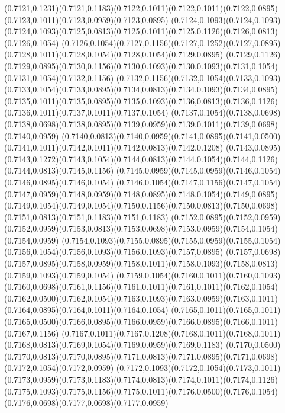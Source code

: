 (0.7121,0.1231)(0.7121,0.1183)(0.7122,0.1011)(0.7122,0.1011)(0.7122,0.0895)(0.7123,0.1011)(0.7123,0.0959)(0.7123,0.0895)
(0.7124,0.1093)(0.7124,0.1093)(0.7124,0.1093)(0.7125,0.0813)(0.7125,0.1011)(0.7125,0.1126)(0.7126,0.0813)(0.7126,0.1054)
(0.7126,0.1054)(0.7127,0.1156)(0.7127,0.1252)(0.7127,0.0895)(0.7128,0.1011)(0.7128,0.1054)(0.7128,0.1054)(0.7129,0.0895)
(0.7129,0.1126)(0.7129,0.0895)(0.7130,0.1156)(0.7130,0.1093)(0.7130,0.1093)(0.7131,0.1054)(0.7131,0.1054)(0.7132,0.1156)
(0.7132,0.1156)(0.7132,0.1054)(0.7133,0.1093)(0.7133,0.1054)(0.7133,0.0895)(0.7134,0.0813)(0.7134,0.1093)(0.7134,0.0895)
(0.7135,0.1011)(0.7135,0.0895)(0.7135,0.1093)(0.7136,0.0813)(0.7136,0.1126)(0.7136,0.1011)(0.7137,0.1011)(0.7137,0.1054)
(0.7137,0.1054)(0.7138,0.0698)(0.7138,0.0698)(0.7138,0.0895)(0.7139,0.0959)(0.7139,0.1011)(0.7139,0.0698)(0.7140,0.0959)
(0.7140,0.0813)(0.7140,0.0959)(0.7141,0.0895)(0.7141,0.0500)(0.7141,0.1011)(0.7142,0.1011)(0.7142,0.0813)(0.7142,0.1208)
(0.7143,0.0895)(0.7143,0.1272)(0.7143,0.1054)(0.7144,0.0813)(0.7144,0.1054)(0.7144,0.1126)(0.7144,0.0813)(0.7145,0.1156)
(0.7145,0.0959)(0.7145,0.0959)(0.7146,0.1054)(0.7146,0.0895)(0.7146,0.1054)
\PST@Solid(0.7146,0.1054)(0.7147,0.1156)(0.7147,0.1054)(0.7147,0.0959)(0.7148,0.0959)(0.7148,0.0895)(0.7148,0.1054)(0.7149,0.0895)
(0.7149,0.1054)(0.7149,0.1054)(0.7150,0.1156)(0.7150,0.0813)(0.7150,0.0698)(0.7151,0.0813)(0.7151,0.1183)(0.7151,0.1183)
(0.7152,0.0895)(0.7152,0.0959)(0.7152,0.0959)(0.7153,0.0813)(0.7153,0.0698)(0.7153,0.0959)(0.7154,0.1054)(0.7154,0.0959)
(0.7154,0.1093)(0.7155,0.0895)(0.7155,0.0959)(0.7155,0.1054)(0.7156,0.1054)(0.7156,0.1093)(0.7156,0.1093)(0.7157,0.0895)
(0.7157,0.0698)(0.7157,0.0895)(0.7158,0.0959)(0.7158,0.1011)(0.7158,0.1093)(0.7158,0.0813)(0.7159,0.1093)(0.7159,0.1054)
(0.7159,0.1054)(0.7160,0.1011)(0.7160,0.1093)(0.7160,0.0698)(0.7161,0.1156)(0.7161,0.1011)(0.7161,0.1011)(0.7162,0.1054)
(0.7162,0.0500)(0.7162,0.1054)(0.7163,0.1093)(0.7163,0.0959)(0.7163,0.1011)(0.7164,0.0895)(0.7164,0.1011)(0.7164,0.1054)
(0.7165,0.1011)(0.7165,0.1011)(0.7165,0.0500)(0.7166,0.0895)(0.7166,0.0959)(0.7166,0.0895)(0.7166,0.1011)(0.7167,0.1156)
(0.7167,0.1011)(0.7167,0.1208)(0.7168,0.1011)(0.7168,0.1011)(0.7168,0.0813)(0.7169,0.1054)(0.7169,0.0959)(0.7169,0.1183)
(0.7170,0.0500)(0.7170,0.0813)(0.7170,0.0895)(0.7171,0.0813)(0.7171,0.0895)(0.7171,0.0698)(0.7172,0.1054)(0.7172,0.0959)
(0.7172,0.1093)(0.7172,0.1054)(0.7173,0.1011)(0.7173,0.0959)(0.7173,0.1183)(0.7174,0.0813)(0.7174,0.1011)(0.7174,0.1126)
(0.7175,0.1093)(0.7175,0.1156)(0.7175,0.1011)(0.7176,0.0500)(0.7176,0.1054)(0.7176,0.0698)(0.7177,0.0698)(0.7177,0.0959)
